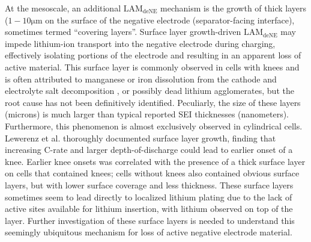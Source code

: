 \documentclass[journal=jpclcd,manuscript=article]{achemso}
\begin{document}
At the mesoscale, an additional $\mathrm{LAM_{deNE}}$ mechanism is the growth of thick layers ($1-10 \mathrm{\mu m}$ on the surface of the negative electrode (separator-facing interface), sometimes termed ``covering layers''\cite{lewerenz_post-mortem_2017, lewerenz_systematic_2017, willenberg_development_2020}.
Surface layer growth-driven $\mathrm{LAM_{deNE}}$ may impede lithium-ion transport into the negative electrode during charging, effectively isolating portions of the electrode and resulting in an apparent loss of active material. This surface layer is commonly observed in cells with knees and is often attributed to manganese or iron dissolution from the cathode and electrolyte salt decomposition \cite{lewerenz_post-mortem_2017,lewerenz_systematic_2017,zhu_investigation_2021,stiaszny_electrochemical_2014,rahe_nanoscale_2019,keil_linear_2019,sarasketa-zabala_understanding_2015, li_degradation_2016, klett_non-uniform_2014, klett_uneven_2015, willenberg_high-precision_2020, wang_cycle-life_2011}, or possibly dead lithium agglomerates\cite{schindler_fast_2018}, but the root cause has not been definitively identified. Peculiarly, the size of these layers (microns) is much larger than typical reported SEI thicknesses (nanometers)\cite{peled_reviewsei_2017}. Furthermore, this phenomenon is almost exclusively observed in cylindrical cells.
Lewerenz et al.\cite{lewerenz_post-mortem_2017,lewerenz_systematic_2017} thoroughly documented surface layer growth, finding that increasing C-rate and larger depth-of-discharge could lead to earlier onset of a knee. Earlier knee onsets was correlated with the presence of a thick surface layer on cells that contained knees; cells without knees also contained obvious surface layers, but with lower surface coverage and less thickness. These surface layers sometimes seem to lead directly to localized lithium plating due to the lack of active sites available for lithium insertion, with lithium observed on top of the layer.\cite{zhu_investigation_2021}
Further investigation of these surface layers is needed to understand this seemingly ubiquitous mechanism for loss of active negative electrode material.
\end{document}
